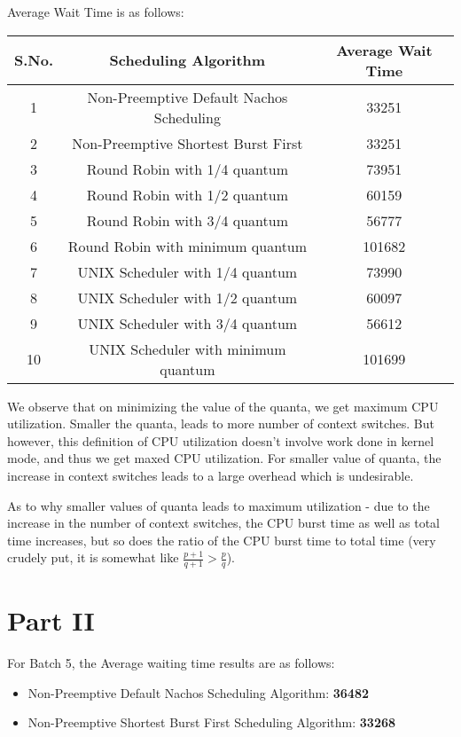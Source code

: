 \documentclass[]{article}
\begin{document}
Average Wait Time is as follows:

\begin{center}
\begin{tabular}{|c|c|c|}
\hline
S.No. & Scheduling Algorithm & Average Wait Time\\
\hline
1 & Non-Preemptive Default Nachos Scheduling & 33251\\
2 & Non-Preemptive Shortest Burst First & 33251\\
3 & Round Robin with 1/4 quantum & 73951\\
4 & Round Robin with 1/2 quantum & 60159\\
5 & Round Robin with 3/4 quantum & 56777\\
6 & Round Robin with minimum quantum & 101682\\
7 & UNIX Scheduler with 1/4 quantum & 73990\\
8 & UNIX Scheduler with 1/2 quantum & 60097\\
9 & UNIX Scheduler with 3/4 quantum & 56612\\
10 & UNIX Scheduler with minimum quantum & 101699\\
\hline
\end{tabular}
\end{center}

We observe that on minimizing the value of the quanta, we get maximum CPU utilization. Smaller the quanta, leads to more number of context switches. But however, this definition of CPU utilization doesn't involve work done in kernel mode, and thus we get maxed CPU utilization. For smaller value of quanta, the increase in context switches leads to a large overhead which is undesirable.

As to why smaller values of quanta leads to maximum utilization - due to the increase in the number of context switches, the CPU burst time as well as total time increases, but so does the ratio of the CPU burst time to total time (very crudely put, it is somewhat like $\frac{p+1}{q+1}>\frac{p}{q}$).
\section{Part II}

For Batch 5, the Average waiting time results are as follows:

\begin{itemize}
\item Non-Preemptive Default Nachos Scheduling Algorithm: \textbf{36482}
\item Non-Preemptive Shortest Burst First Scheduling Algorithm: \textbf{33268}
\end{itemize}
\end{document}
